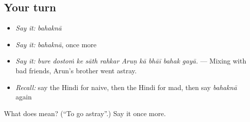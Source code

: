 \subsection*{Your turn}
\begin{itemize}
\raggedright
  \item \emph{Say it:} \emph{bahaknā}
  \item \emph{Say it:} \emph{bahaknā}, once more
  \item \emph{Say it:} \emph{bure dostoṁ ke sāth rahkar Aruṇ kā bhāī bahak gayā.} — Mixing with bad friends, Arun's brother went astray.
  \item \emph{Recall:} say the Hindi for naive, then the Hindi for mad, then say \emph{bahaknā} again
\end{itemize}

\begin{tcolorbox}[breakable,colback=teal!4,colframe=teal!35!black,title={Before you move on}]
What does  mean? (\textquotedblleft{}To go astray\textquotedblright{}.) Say it once more.
\end{tcolorbox}
